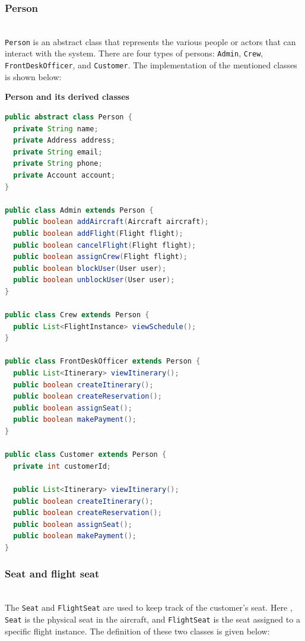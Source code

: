 \subsubsection{Person}\label{rZQU1btcCeTmM8Dh6w8ow}
\\
\texttt{Person} is an abstract class that represents the various people or actors that can interact with the system. There are four types of persons: \texttt{Admin}, \texttt{Crew}, \texttt{FrontDeskOfficer}, and \texttt{Customer}. The implementation of the mentioned classes is shown below:

\textbf{Person and its derived classes}

\begin{lstlisting}[language=Java]
public abstract class Person {
  private String name;
  private Address address;
  private String email;
  private String phone;
  private Account account;
}

public class Admin extends Person {
  public boolean addAircraft(Aircraft aircraft);
  public boolean addFlight(Flight flight);
  public boolean cancelFlight(Flight flight);
  public boolean assignCrew(Flight flight);
  public boolean blockUser(User user);
  public boolean unblockUser(User user);
}

public class Crew extends Person {
  public List<FlightInstance> viewSchedule();
}

public class FrontDeskOfficer extends Person {
  public List<Itinerary> viewItinerary();
  public boolean createItinerary();
  public boolean createReservation();
  public boolean assignSeat();
  public boolean makePayment();
}

public class Customer extends Person {
  private int customerId;

  public List<Itinerary> viewItinerary();
  public boolean createItinerary();
  public boolean createReservation();
  public boolean assignSeat();
  public boolean makePayment();
}
\end{lstlisting}

\subsubsection{Seat and flight seat}\label{OHgBg0HPEEy-U8QzVlSjR}
\\
The \texttt{Seat} and \texttt{FlightSeat} are used to keep track of the customer's seat. Here , \texttt{Seat} is the physical seat in the aircraft, and \texttt{FlightSeat} is the seat assigned to a specific flight instance. The definition of these two classes is given below:

